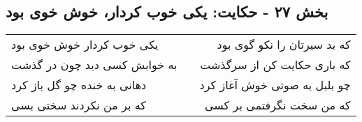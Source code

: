 \begin{center}
\section*{بخش ۲۷ - حکایت: یکی خوب کردار، خوش خوی بود}
\label{sec:027}
\begin{longtable}{l p{0.5cm} r}
یکی خوب کردار خوش خوی بود
&&
که بد سیرتان را نکو گوی بود
\\
به خوابش کسی دید چون در گذشت
&&
که باری حکایت کن از سرگذشت
\\
دهانی به خنده چو گل باز کرد
&&
چو بلبل به صوتی خوش آغاز کرد
\\
که بر من نکردند سختی بسی
&&
که من سخت نگرفتمی بر کسی
\\
\end{longtable}
\end{center}
